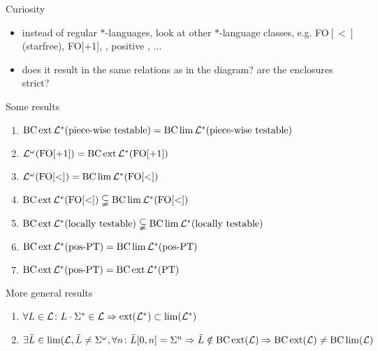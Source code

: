 \documentclass[handout]{beamer}
\begin{document}
\begin{frame}[<+->]{Curiosity}
\begin{itemize}
\item instead of regular $*$-languages, look at other $*$-language classes, e.g. FO$[<]$ (starfree), FO[+1], \PT, positive \PT, ...
\item does it result in the same relations as in the diagram? are the enclosures strict?
\end{itemize}
\end{frame}

\begin{frame}[<+->]{Some results}
\begin{enumerate}
\item $ \operatorname{BC} \operatorname{ext} \mathcal{L}^* (\textup{\textrm{piece-wise testable}}) = \operatorname{BC} \lim \mathcal{L}^* (\textup{\textrm{piece-wise testable}}) $
\item $ \mathcal{L}^\omega (\mathrm{FO[+1]}) = \operatorname{BC} \operatorname{ext} \mathcal{L}^*(\mathrm{FO[+1]}) $
\item $ \mathcal{L}^\omega (\mathrm{FO[<]}) = \operatorname{BC} \lim \mathcal{L}^*(\mathrm{FO[<]}) $
\item $ \operatorname{BC} \operatorname{ext} \mathcal{L}^*( \mathrm{FO[<]} ) \subsetneqq \operatorname{BC} \lim \mathcal{L}^* ( \mathrm{FO[<]} )  $
\item $ \operatorname{BC} \operatorname{ext} \mathcal{L}^* (\textup{\textrm{locally testable}}) \subsetneqq \operatorname{BC} \lim \mathcal{L}^*(\textup{\textrm{locally testable}}) $
\item $ \operatorname{BC} \operatorname{ext} \mathcal{L}^* (\textup{\textrm{pos-PT}}) = \operatorname{BC} \lim \mathcal{L}^* (\textup{\textrm{pos-PT}}) $
\item $ \operatorname{BC} \operatorname{ext} \mathcal{L}^*(\textup{\textrm{pos-PT}}) = \operatorname{BC} \operatorname{ext} \mathcal{L}^* (\textup{\textrm{PT}}) $
\end{enumerate}
\end{frame}

\begin{frame}[<+->]{More general results}
\begin{enumerate}
\item
$\forall L \in \Lang \colon L \cdot \Sigma^* \in \Lang \linebreak
\Rightarrow \ext(\Lang^*) \subset \lim(\Lang^*)$

\item
$\exists \tilde{L} \in \lim(\Lang, \tilde{L} \neq \Sigma^\omega, \forall n \colon \tilde{L}[0,n] = \Sigma^n \linebreak
\Rightarrow \tilde{L} \notin \BC \ext (\Lang) \linebreak
\Rightarrow \BC \ext (\Lang) \neq \BC \lim (\Lang)$

\end{enumerate}
\end{frame}
\end{document}
